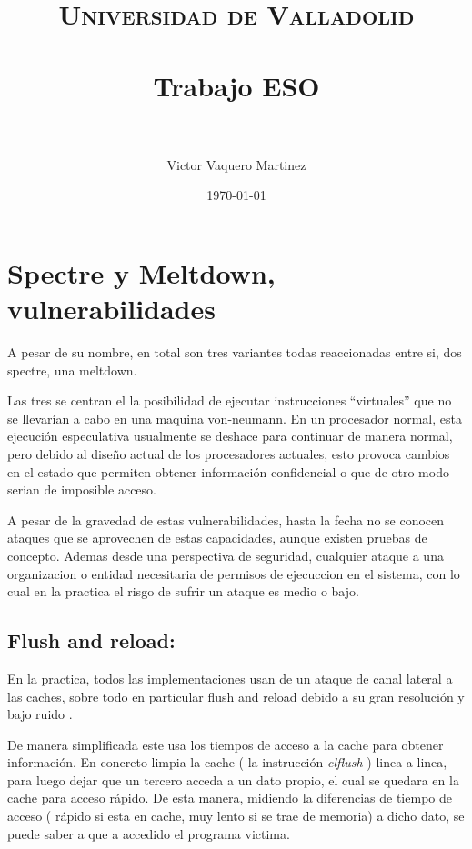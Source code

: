 \documentclass[paper=a4, fontsize=11pt]{scrartcl} %
\title{
\normalfont \normalsize
\textsc{Universidad de Valladolid} \\ [25pt] %
\horrule{0.5pt} \\[0.4cm] %
\huge Trabajo ESO \\ %
\horrule{2pt} \\[0.5cm] %
}
\author{Victor Vaquero Martinez} %
\date{\normalsize\today} %
\begin{document}
\maketitle






\section{Spectre y Meltdown, vulnerabilidades}

A pesar de su nombre, en total son tres variantes todas reaccionadas entre si, dos spectre, una meltdown.

Las tres se centran el la posibilidad de ejecutar instrucciones “virtuales” que no se llevarían a cabo en una maquina von-neumann. En un procesador normal, esta ejecución especulativa usualmente se deshace para continuar de manera normal, pero debido al diseño actual de los procesadores actuales, esto provoca cambios en el estado que permiten obtener información confidencial o que de otro modo serian de imposible acceso.

A pesar de la gravedad de estas vulnerabilidades, hasta la fecha no se conocen ataques que se aprovechen de estas capacidades, aunque existen pruebas de concepto. Ademas desde una perspectiva de seguridad, cualquier ataque a una organizacion o entidad necesitaria de permisos de ejecuccion en el sistema, con lo cual en la practica el risgo de sufrir un ataque es medio o bajo.

\subsection{Flush and reload:}

En la practica, todos las implementaciones usan de un ataque de canal lateral a las caches, sobre todo en particular  flush and reload debido a su gran resolución y bajo ruido \cite{flushreload}. 


De manera simplificada este usa los tiempos de acceso a la cache para obtener información. En concreto limpia la cache ( la instrucción \textit{clflush} ) linea a linea, para luego dejar que un tercero acceda a un dato propio, el cual se quedara en la cache para acceso rápido. De esta manera, midiendo la diferencias de tiempo de acceso ( rápido si esta en cache, muy lento si se trae de memoria) a dicho dato, se puede saber a que a accedido el programa victima.
\end{document}
